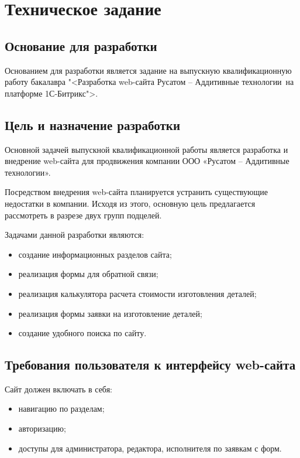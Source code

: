\newsection
\section{Техническое задание}
\subsection{Основание для разработки}

Основанием для разработки является задание на выпускную квалификационную работу бакалавра "<Разработка web-сайта \textquotedbl Русатом -- Аддитивные технологии\textquotedbl\ на платформе 1С-Битрикс">.

\subsection{Цель и назначение разработки}

Основной задачей выпускной квалификационной работы является разработка и внедрение web-сайта для продвижения компании ООО «Русатом – Аддитивные технологии».

Посредством внедрения web-сайта планируется устранить существующие недостатки в компании. Исходя из этого, основную цель предлагается рассмотреть в разрезе двух групп подцелей.

Задачами данной разработки являются:
\begin{itemize}
\item создание информационных разделов сайта;
\item    реализация формы для обратной связи;
\item реализация калькулятора расчета стоимости изготовления деталей;
\item реализация формы заявки на изготовление деталей;
\item создание удобного поиска по сайту.
\end{itemize}

\subsection{Требования пользователя к интерфейсу web-сайта}

Сайт должен включать в себя:
\begin{itemize}
    \item навигацию по разделам;
    \item авторизацию;
    \item доступы для администратора, редактора, исполнителя по заявкам с форм.
\end{itemize}

